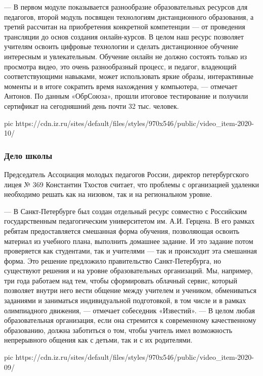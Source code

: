 — В первом модуле показывается разнообразие образовательных ресурсов для
педагогов, второй модуль посвящен технологиям дистанционного образования, а
третий рассчитан на приобретения конкретной компетенции — от проведения
трансляции до основ создания онлайн-курсов. В целом наш ресурс позволяет
учителям освоить цифровые технологии и сделать дистанционное обучение
интересным и увлекательным. Обучение онлайн не должно состоять только из
просмотра видео, это очень разнообразный процесс, и педагог, владеющий
соответствующими навыками, может использовать яркие образы, интерактивные
моменты и в итоге сократить время нахождения у компьютера, — отмечает Антонов.
По данным «ОбрСоюза», прошли итоговое тестирование и получили сертификат на
сегодняшний день почти 32 тыс. человек.

\ifcmt
pic https://cdn.iz.ru/sites/default/files/styles/970x546/public/video_item-2020-10/%
\fi

\subsubsection{Дело школы}

Председатель Ассоциация молодых педагогов России, директор петербургского лицея
№ 369 Константин Тхостов считает, что проблемы с организацией удаленки
необходимо решать как на низовом, так и на региональном уровне.

— В Санкт-Петербурге был создан отдельный ресурс совместно с Российским
государственным педагогическим университетом им. А.И. Герцена. В его рамках
ребятам предоставляется смешанная форма обучения, позволяющая освоить материал
из учебного плана, выполнить домашнее задание. И это задание потом проверяется
как студентами, так и учителями — так и происходит эта смешанная форма. Это
решение предложило правительство Санкт-Петербурга, но существуют решения и на
уровне образовательных организаций. Мы, например, три года работаем над тем,
чтобы сформировать облачный сервис, который позволяет внутри него вести общение
между учителем и учеником, обмениваться заданиями и заниматься индивидуальной
подготовкой, в том числе и в рамках олимпиадного движения, — отмечает
собеседник «Известий». — В целом любая образовательная организация, если она
стремится к современному качественному образованию, должна заботиться о том,
чтобы учитель имел возможность непрерывного общения как с детьми, так и с их
родителями.

\ifcmt
pic https://cdn.iz.ru/sites/default/files/styles/970x546/public/video_item-2020-09/%
\fi
